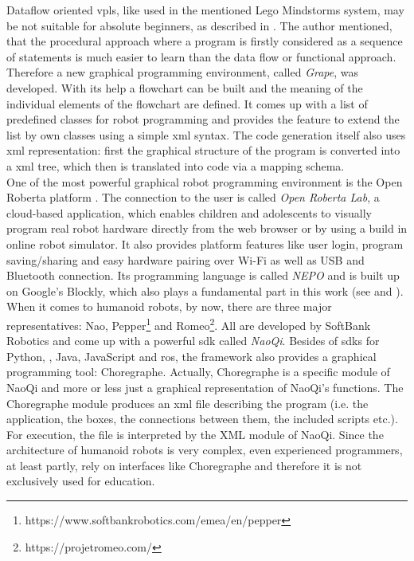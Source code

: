 Dataflow oriented \glspl{vpl}, like used in the mentioned Lego Mindstorms system, may be not suitable for absolute beginners, as described in \cite{Grape}. The author mentioned, that the procedural approach where a program is firstly considered as a sequence of statements is much easier to learn than the data flow or functional approach. Therefore a new graphical programming environment, called \textit{Grape}, was developed. With its help a flowchart can be built and the meaning of the individual elements of the flowchart are defined. It comes up with a list of predefined classes for robot programming and provides the feature to extend the list by own classes using a simple \gls{xml} syntax. The code generation itself also uses \gls{xml} representation: first the graphical structure of the program is converted into a \gls{xml} tree, which then is translated into \Cpp{} code via a mapping schema. \\

One of the most powerful graphical robot programming environment is the Open Roberta platform \cite{OpenRoberta}. The connection to the user is called \textit{Open Roberta Lab}, a cloud-based application, which enables children and adolescents to visually program real robot hardware directly from the web browser or by using a build in online robot simulator. It also provides platform features like user login, program saving/sharing and easy hardware pairing over Wi-Fi as well as USB and Bluetooth connection.\cite{Ketterl_Jost_Leimbach_Budde_2015} Its programming language is called \textit{NEPO} and is built up on Google's Blockly, which also plays a fundamental part in this work (see  and ). \\

When it comes to humanoid robots, by now, there are three major representatives: Nao\cite{Nao5152516}, Pepper\footnote{https://www.softbankrobotics.com/emea/en/pepper} and Romeo\footnote{https://projetromeo.com/}. All are developed by SoftBank Robotics and come up with a powerful \gls{sdk} called \textit{NaoQi}. Besides of \glspl{sdk} for Python, \Cpp{}, Java, JavaScript and \gls{ros}, the framework also provides a graphical programming tool: Choregraphe\cite{Choregraphe5326209}. Actually, Choregraphe is a specific module of NaoQi and more or less just a graphical representation of NaoQi's functions. The Choregraphe module produces an \gls{xml} file describing the program (i.e. the application, the boxes, the connections between them, the included scripts etc.). For execution, the file is interpreted by the XML module of NaoQi. Since the architecture of humanoid robots is very complex, even experienced programmers, at least partly, rely on interfaces like Choregraphe and therefore it is not exclusively used for education. \\

